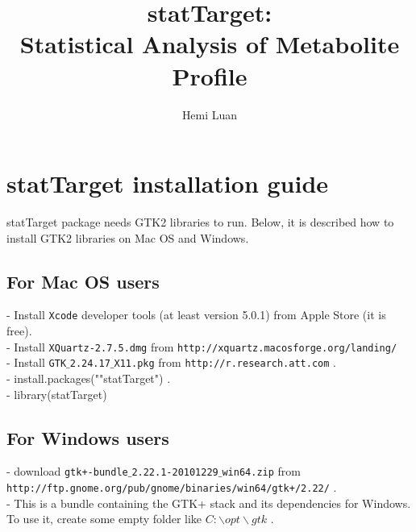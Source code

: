 \documentclass[english]{article}
\begin{document}


\author{Hemi Luan}

\title{statTarget:\\Statistical Analysis of Metabolite Profile}

\maketitle

\tableofcontents

\section{statTarget installation guide}

statTarget package needs GTK2 libraries to run.
Below, it is described how to install GTK2 libraries on Mac OS and Windows. \\

\subsection{For Mac OS users}


 - Install \texttt{Xcode} developer tools (at least version 5.0.1) from Apple Store (it is free).\\

 - Install \texttt{XQuartz-2.7.5.dmg} from  \texttt{http://xquartz.macosforge.org/landing/} \\

 - Install \texttt{GTK}$\_$\texttt{2.24.17}$\_$\texttt{X11.pkg} from \texttt{http://r.research.att.com} .\\

 - install.packages(""statTarget") .\\

 - library(statTarget)


\subsection{For Windows users}

 - download \texttt{gtk+-bundle}$\_$\texttt{2.22.1-20101229}$\_$\texttt{win64.zip} from \newline
\texttt{http://ftp.gnome.org/pub/gnome/binaries/win64/gtk+/2.22/} . \\

 - This is a bundle containing the GTK+ stack and its dependencies for Windows. To use it, create some empty folder like \texttt{$C:\backslash opt \backslash gtk$} .\\
\end{document}
